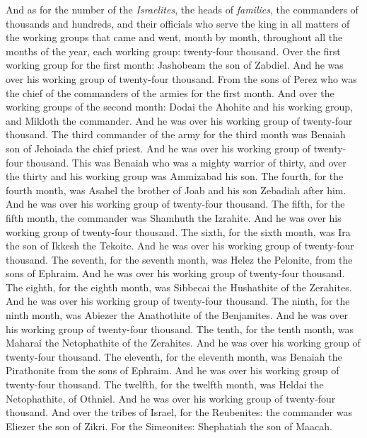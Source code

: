\begin{biblechapter} %
 And as for the number of the \textit{Israelites}, the heads of \textit{families}, the commanders of thousands and hundreds, and their officials who serve the king in all matters of the working groups that came and went, month by month, throughout all the months of the year, each working group: twenty-four thousand.
\verse Over the first working group for the first month: Jashobeam the son of Zabdiel. And he was over his working group of twenty-four thousand.
\verse From the sons of Perez who was the chief of the commanders of the armies for the first month.
\verse And over the working groups of the second month: Dodai the Ahohite and his working group, and Mikloth the commander. And he was over his working group of twenty-four thousand.
\verse The third commander of the army for the third month was Benaiah son of Jehoiada the chief priest. And he was over his working group of twenty-four thousand.
\verse This was Benaiah who was a mighty warrior of thirty, and over the thirty and his working group was Ammizabad his son.
\verse The fourth, for the fourth month, was Asahel the brother of Joab and his son Zebadiah after him. And he was over his working group of twenty-four thousand.
\verse The fifth, for the fifth month, the commander was Shamhuth the Izrahite. And he was over his working group of twenty-four thousand.
\verse The sixth, for the sixth month, was Ira the son of Ikkesh the Tekoite. And he was over his working group of twenty-four thousand.
\verse The seventh, for the seventh month, was Helez the Pelonite, from the sons of Ephraim. And he was over his working group of twenty-four thousand.
\verse The eighth, for the eighth month, was Sibbecai the Hushathite of the Zerahites. And he was over his working group of twenty-four thousand.
\verse The ninth, for the ninth month, was Abiezer the Anathothite of the Benjamites. And he was over his working group of twenty-four thousand.
\verse The tenth, for the tenth month, was Maharai the Netophathite of the Zerahites. And he was over his working group of twenty-four thousand.
\verse The eleventh, for the eleventh month, was Benaiah the Pirathonite from the sons of Ephraim. And he was over his working group of twenty-four thousand.
\verse The twelfth, for the twelfth month, was Heldai the Netophathite, of Othniel. And he was over his working group of twenty-four thousand.
 And over the tribes of Israel, for the Reubenites: the commander was Eliezer the son of Zikri. For the Simeonites: Shephatiah the son of Maacah.

\end{biblechapter}
